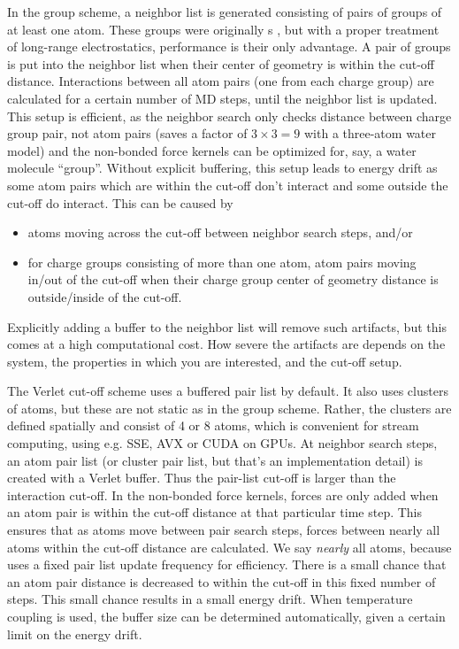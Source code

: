 In the group scheme, a neighbor list is generated consisting of pairs
of groups of at least one atom. These groups were originally
s , but with a proper treatment of long-range
electrostatics, performance is their only advantage. A pair of groups
is put into the neighbor list when their center of geometry is within
the cut-off distance. Interactions between all atom pairs (one from
each charge group) are calculated for a certain number of MD steps,
until the neighbor list is updated. This setup is efficient, as the
neighbor search only checks distance between charge group pair, not
atom pairs (saves a factor of $3 \times 3 = 9$ with a three-atom water
model) and the non-bonded force kernels can be optimized for, say, a
water molecule ``group''. Without explicit buffering, this setup leads
to energy drift as some atom pairs which are within the cut-off don't
interact and some outside the cut-off do interact. This can be caused
by
\begin{itemize}
\item atoms moving across the cut-off between neighbor search steps, and/or
\item for charge groups consisting of more than one atom, atom pairs
  moving in/out of the cut-off when their charge group center of
  geometry distance is outside/inside of the cut-off.
\end{itemize}
Explicitly adding a buffer to the neighbor list will remove such
artifacts, but this comes at a high computational cost. How severe the
artifacts are depends on the system, the properties in which you are
interested, and the cut-off setup.

The Verlet cut-off scheme uses a buffered pair list by default. It
also uses clusters of atoms, but these are not static as in the group
scheme. Rather, the clusters are defined spatially and consist of 4 or
8 atoms, which is convenient for stream computing, using e.g. SSE, AVX
or CUDA on GPUs. At neighbor search steps, an atom pair list (or
cluster pair list, but that's an implementation detail) is created
with a Verlet buffer. Thus the pair-list cut-off is larger than the
interaction cut-off. In the non-bonded force kernels, forces are only
added when an atom pair is within the cut-off distance at that
particular time step. This ensures that as atoms move between pair
search steps, forces between nearly all atoms within the cut-off
distance are calculated. We say {\em nearly} all atoms, because
{\gromacs} uses a fixed pair list update frequency for
efficiency. There is a small chance that an atom pair distance is
decreased to within the cut-off in this fixed number of steps. This
small chance results in a small energy drift. When temperature
coupling is used, the buffer size can be determined automatically,
given a certain limit on the energy drift.

